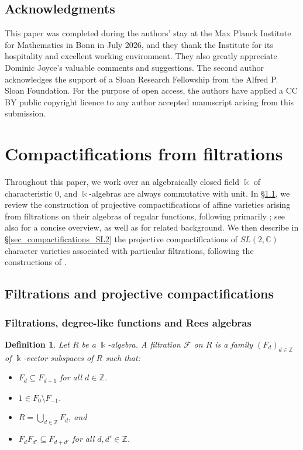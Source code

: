 \documentclass[12pt,letterpaper, reqno]{amsart}
\theoremstyle{defstyle} \newtheorem{definition}[theorem]{Definition}
\theoremstyle{remark}
\numberwithin{equation}{section}
\numberwithin{figure}{section}
\newcommand{\kk} {\Bbbk}
\newcommand{\CC} {\mathbb{C}}
\newcommand{\ZZ} {\mathbb{Z}}
\begin{document}
\subsection{Acknowledgments} 
This paper was completed during the authors’ stay at the Max Planck Institute for Mathematics in Bonn in July 2026, and they thank the Institute for its hospitality and excellent working environment. They also greatly appreciate Dominic Joyce’s valuable comments and suggestions. The second author acknowledges the support of a Sloan Research Fellowship from the Alfred P. Sloan Foundation. For the purpose of open access, the authors have applied a CC BY public copyright licence to any author accepted manuscript arising from this submission.

\section{Compactifications from filtrations}
\label{sec_compactification}
Throughout this paper, we work over an algebraically closed field \(\kk\) of characteristic \(0\), and $\kk$-algebras are always commutative with unit. 
In \S\ref{sec_filtrations}, we review the construction of projective compactifications of affine varieties arising from filtrations on their algebras of regular functions, following primarily \cite{mondal2014projective}; see also \cite[\S 2.1]{farajzadeh2023compactifications} for a concise overview, as well as \cite{demazure1988anneaux,watanabe} for related background. We then describe in \S\ref{sec_compactifications_SL2} the projective compactifications of $SL(2,\CC)$ character varieties associated with particular filtrations, following the constructions of \cite{ayilliath2025geometric,farajzadeh2023compactifications}.

\subsection{Filtrations and projective compactifications}
\label{sec_filtrations}

\subsubsection{Filtrations, degree-like functions and Rees algebras}

\begin{definition} Let $R$ be a $\kk$-algebra. A \emph{filtration} $\mathcal{F}$ on $R$ is a family
$(F_d)_{d \in \ZZ}$
of $\kk$-vector subspaces of $R$ such that:
\begin{itemize}
    \item[(i)] \(F_d \subseteq F_{d+1}\) for all \(d \in \mathbb{Z}\).
    \item[(ii)] \(1 \in F_0 \setminus F_{-1}\).
    \item[(iii)] $R = \bigcup_{d \in \mathbb{Z}} F_d$, and
    \item[(iv)] $F_d F_{d'} \subseteq F_{d+d'}$ for all \(d,d' \in \mathbb{Z}\).
\end{itemize}
\end{definition}
\end{document}
